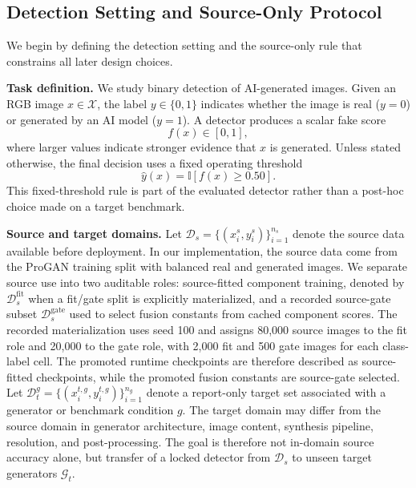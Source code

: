\documentclass[lettersize,journal]{IEEEtran}
\begin{document}
\subsection{Detection Setting and Source-Only Protocol}
\label{sec:problem_formulation}

We begin by defining the detection setting and the source-only rule that constrains all later design choices.

\textbf{Task definition.}
We study binary detection of AI-generated images. Given an RGB image $x \in \mathcal{X}$, the label $y \in \{0,1\}$ indicates whether the image is real ($y=0$) or generated by an AI model ($y=1$). A detector produces a scalar fake score
\begin{equation}
    f(x) \in [0,1],
\end{equation}
where larger values indicate stronger evidence that $x$ is generated. Unless stated otherwise, the final decision uses a fixed operating threshold
\begin{equation}
    \hat{y}(x) = \mathbb{I}\left[f(x) \geq 0.50\right].
\end{equation}
This fixed-threshold rule is part of the evaluated detector rather than a post-hoc choice made on a target benchmark.

\textbf{Source and target domains.}
Let $\mathcal{D}_{s}=\{(x_i^s,y_i^s)\}_{i=1}^{n_s}$ denote the source data available before deployment. In our implementation, the source data come from the ProGAN training split with balanced real and generated images. We separate source use into two auditable roles: source-fitted component training, denoted by $\mathcal{D}_{s}^{\mathrm{fit}}$ when a fit/gate split is explicitly materialized, and a recorded source-gate subset $\mathcal{D}_{s}^{\mathrm{gate}}$ used to select fusion constants from cached component scores. The recorded materialization uses seed 100 and assigns 80,000 source images to the fit role and 20,000 to the gate role, with 2,000 fit and 500 gate images for each class-label cell. The promoted runtime checkpoints are therefore described as source-fitted checkpoints, while the promoted fusion constants are source-gate selected. Let $\mathcal{D}_{t}^{g}=\{(x_i^{t,g},y_i^{t,g})\}_{i=1}^{n_g}$ denote a report-only target set associated with a generator or benchmark condition $g$. The target domain may differ from the source domain in generator architecture, image content, synthesis pipeline, resolution, and post-processing. The goal is therefore not in-domain source accuracy alone, but transfer of a locked detector from $\mathcal{D}_{s}$ to unseen target generators $\mathcal{G}_{t}$.
\end{document}
